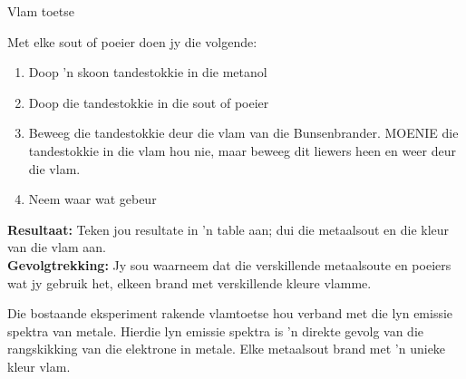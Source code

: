 \begin{i_experiment}{Vlam toetse}
{Met elke sout of poeier doen jy die volgende: \label{m38741*id7092}\begin{enumerate}[noitemsep, label=\textbf{\arabic*}. ] 
            \item Doop 'n skoon tandestokkie in die metanol 
\item Doop die tandestokkie in die sout of poeier
\item Beweeg die tandestokkie deur die vlam van die Bunsenbrander. MOENIE die tandestokkie in die vlam hou nie,
maar beweeg dit liewers heen en weer deur die vlam.
\item Neem waar wat gebeur
\end{enumerate}
\label{m38741*eip-6993}\noindent{}\textbf{Resultaat:}\newline
Teken jou resultate in 'n table aan; dui die metaalsout en die kleur van die vlam aan.
\\ 
\label{m38741*eip-6994}\noindent{}\textbf{Gevolgtrekking:}\newline
Jy sou waarneem dat die verskillende metaalsoute en poeiers wat jy gebruik het, elkeen brand met verskillende kleure vlamme.}
\end{i_experiment}
Die bostaande eksperiment rakende vlamtoetse hou verband met die lyn emissie spektra van metale. Hierdie lyn emissie spektra is 'n direkte gevolg van die rangskikking van die elektrone in metale. Elke metaalsout brand met 'n unieke kleur vlam. \par \label{m38741*secfhsst!!!underscore!!!id766}

